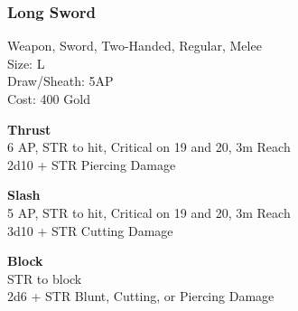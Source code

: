 \subsubsection{Long Sword}\label{weapon:longSword}
Weapon, Sword, Two-Handed, Regular, Melee\\
Size: L\\
Draw/Sheath: 5AP\\
Cost: 400 Gold

\textbf{Thrust}\\
6 AP, STR to hit, Critical on 19 and 20, 3m Reach\\
2d10 + \texttimes STR Piercing Damage

\textbf{Slash}\\
5 AP, STR to hit, Critical on 19 and 20, 3m Reach\\
3d10 + \texttimes STR Cutting Damage

\textbf{Block}\\
STR to block\\
2d6 + \texttimes STR Blunt, Cutting, or Piercing Damage